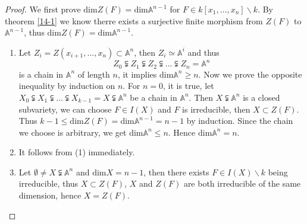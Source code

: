 \documentclass{amsart}
\theoremstyle{plain}
\theoremstyle{definition}
\theoremstyle{remark}
\numberwithin{equation}{section}
\begin{document}
\begin{proof}
	We first prove $ \text{dim} Z(F)=\text{dim}\mathbb{A}^{n-1} $ for $ F\in k[x_1,\dots,x_n]\backslash k $. By theorem \ref{14-1} we know therre exists a surjective finite morphism from $ Z(F) $ to $ \mathbb{A}^{n-1} $, thus $ \text{dim}Z(F)=\text{dim}\mathbb{A}^{n-1}$.  
	\begin{enumerate}
		\item Let $ Z_i=Z(x_{i+1},\dots, x_{n})\subset \mathbb{A}^{n} $, then $ Z_i\simeq \mathbb{A}^i $ and thus 
		$$
		Z_0\subsetneqq Z_1\subsetneqq Z_2\subsetneqq \dots\subsetneqq Z_n=\mathbb{A}^n
		$$
		is a chain in $ \mathbb{A}^n $ of length $ n $, it implies $ \text{dim}\mathbb{A}^n\geq n $. Now we prove the opposite inequality by induction on $ n $. For $ n=0 $, it is true, let $ X_0\subsetneqq X_1\subsetneqq \dots\subsetneqq X_{k-1}=X\subsetneqq \mathbb{A}^n $ be a chain in $ \mathbb{A}^n $. Then $ X\subsetneqq \mathbb{A}^{n} $ is a closed subvariety, we can choose $ F\in I(X) $ and $ F $ is irreducible, then $ X\subset Z(F) $. Thus $ k-1\leq \text{dim}Z(F)=\text{dim}\mathbb{A}^{n-1}=n-1 $ by induction. Since the chain we choose is arbitrary, we get $ \text{dim}\mathbb{A}^{n}\leq n $. Hence $ \text{dim}\mathbb{A}^n=n $.
		\item It follows from (1) immediately.
		\item Let $ \emptyset \neq X\subsetneqq \mathbb{A}^n $ and $ \text{dim}X=n-1 $, then there exists $ F\in I(X)\backslash k $ being irreducible, thus $ X\subset Z(F) $, $ X $ and $ Z(F) $ are both irreducible of the same dimension, hence $ X=Z(F) $.
	\end{enumerate}
\end{proof}
\end{document}

